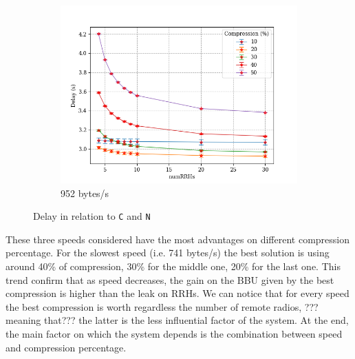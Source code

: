 \documentclass[11pt,a4paper,oneside, openright]{article}
\begin{document}
\begin{figure}[H]
	\begin{subfigure}{.5\textwidth}
		\centering
		\includegraphics[width=\linewidth]{images/n-vs-delay-s-952}
		\caption{952 bytes/s}
		\label{fig:n-vs-delay-s-952}
	\end{subfigure}
	\caption{Delay in relation to \texttt{C} and \texttt{N}}
	\label{fig:n-vs-delay}
\end{figure}
These three speeds considered have the most advantages on different compression percentage. 
For the slowest speed (i.e. 741 bytes/s) the best solution is using around 40\% of compression, 30\% for the middle one, 20\% for the last one.
This trend confirm that as speed decreases, the gain on the BBU given by the best compression is higher than the leak on RRHs.
We can notice that for every speed the best compression is worth regardless the number of remote radios, ???meaning that??? the latter is the less influential factor of the system.
At the end, the main factor on which the system depends is the combination between speed and compression percentage.
\end{document}
